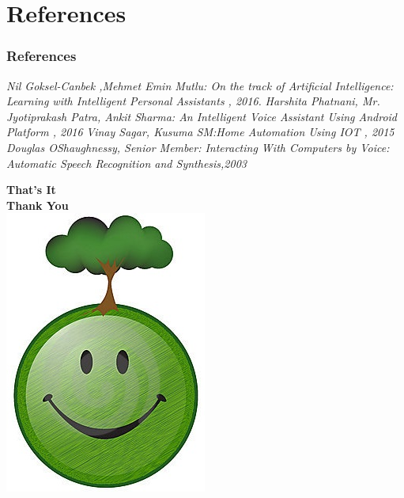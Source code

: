 \documentclass[xcolor=dvipsnames]{beamer}
\begin{document}
\section{References}
\begin{frame}
\frametitle{References}
\begin{thebibliography}{5}
 \emph{ Nil Goksel-Canbek ,Mehmet Emin Mutlu: On the track of Artiﬁcial Intelligence: Learning with Intelligent Personal Assistants , 2016.}{\vspace{.6cm}}
 \emph{Harshita Phatnani, Mr. Jyotiprakash Patra, Ankit Sharma: An Intelligent Voice Assistant Using Android Platform , 2016 }{\vspace{.6cm}}
 \emph{Vinay Sagar, Kusuma SM:Home Automation Using IOT , 2015 }{\vspace{.6cm}}
 \emph{ Douglas OShaughnessy, Senior Member: Interacting With Computers by Voice: Automatic Speech Recognition and Synthesis,2003}{\vspace{1cm}}
\end{thebibliography}
\end{frame}
\begin{frame}
\begin{center}
\textbf{\huge{That's It\\\vspace{0.2cm} Thank You}}\\
\vspace{0.5cm}
\includegraphics[scale=1.5]{thank.jpg}
\end{center}
\end{frame}
\end{document}
